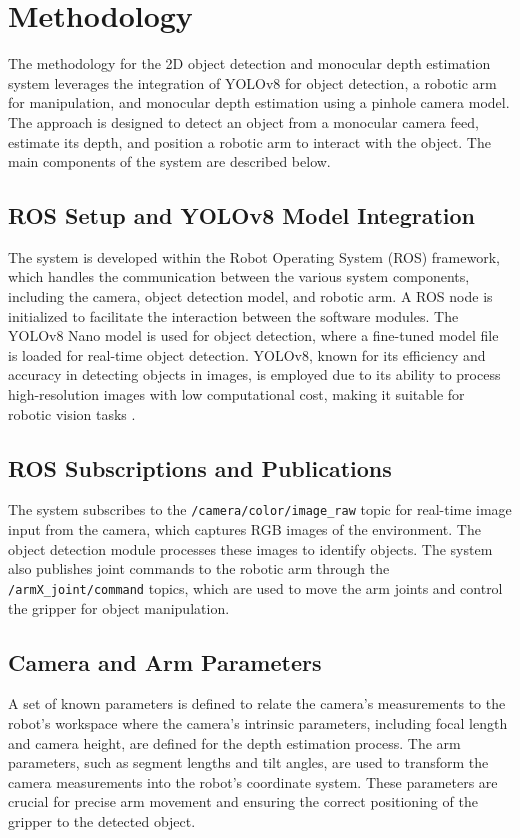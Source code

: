 \section{Methodology}

The methodology for the 2D object detection and monocular depth estimation system leverages the integration of YOLOv8 for object detection, a robotic arm for manipulation, and monocular depth estimation using a pinhole camera model. The approach is designed to detect an object from a monocular camera feed, estimate its depth, and position a robotic arm to interact with the object. The main components of the system are described below.

\subsection{ROS Setup and YOLOv8 Model Integration}
The system is developed within the Robot Operating System (ROS) framework, which handles the communication between the various system components, including the camera, object detection model, and robotic arm. A ROS node is initialized to facilitate the interaction between the software modules. The YOLOv8 Nano model is used for object detection, where a fine-tuned model file is loaded for real-time object detection. YOLOv8, known for its efficiency and accuracy in detecting objects in images, is employed due to its ability to process high-resolution images with low computational cost, making it suitable for robotic vision tasks \cite{redmon2016yolo9000betterfasterstronger}.

\subsection{ROS Subscriptions and Publications}
The system subscribes to the \texttt{/camera/color/image\_raw} topic for real-time image input from the camera, which captures RGB images of the environment. The object detection module processes these images to identify objects. The system also publishes joint commands to the robotic arm through the \texttt{/armX\_joint/command} topics, which are used to move the arm joints and control the gripper for object manipulation.

\subsection{Camera and Arm Parameters}
A set of known parameters is defined to relate the camera's measurements to the robot’s workspace where the camera’s intrinsic parameters, including focal length and camera height, are defined for the depth estimation process. The arm parameters, such as segment lengths and tilt angles, are used to transform the camera measurements into the robot's coordinate system. These parameters are crucial for precise arm movement and ensuring the correct positioning of the gripper to the detected object.

